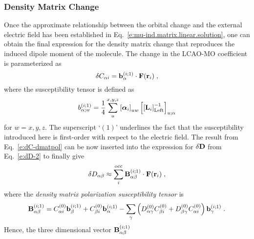 \documentclass[aip,jcp,preprint,amsmath,amssymb,floatfix]{revtex4-1}
\newcommand{\BM}[1]{\bm{#1}}
\begin{document}
\subsubsection{Density Matrix Change}

Once the approximate relationship between the orbital change and the external electric field
has been established in Eq.~\eqref{e:mu-ind.matrix.linear.solution},
one can obtain the final expression for the density matrix change 
that reproduces the induced dipole moment of the molecule.
The change in the LCAO\hyp{}MO coefficient is parameterized as
%
\begin{equation} \label{e:dC-dmatpol}
 \delta C_{\alpha i} = {\bf b}_{\alpha}^{(i;1)} \cdot {\bf F}({\bf r}_i)  \;,
\end{equation}
%
where the susceptibility tensor is defined as
%
\begin{equation} \label{e:susceptibility-b}
  b_{\alpha;w}^{(i;1)}= \frac{1}{4} \sum_u^{x, y, z} \left[ {\BM{\alpha}}_i \right]_{uw}
   \left[ \left[ {\bf L}_i  \right]^{-1}_{\rm Left} \right]_{u;\alpha}  
\end{equation}
%
for $w=x,y,z$. 
The superscript `$(1)$' underlines the fact that the susceptibility introduced here
is first\hyp{}order with respect to the electric field.
The result from Eq.~\eqref{e:dC-dmatpol} can be now inserted into 
the expression for $\delta {\bf D}$ from Eq.~\eqref{e:dD-2} to finally give
%
\begin{equation}\label{e:final-model.HF}
 \delta D_{\alpha\beta} \approx \sum_i^{\rm occ} {\bf B}^{(i;1)}_{\alpha\beta} \cdot {\bf F}({\bf r}_i)  \;,
\end{equation}
%
where the \emph{density matrix polarization susceptibility tensor} is
%
\begin{equation}  \label{e:susceptibility-B}
 {\bf B}^{(i;1)}_{\alpha\beta} = 
                               C_{\alpha i}^{(0)} {\bf b}_{\beta}^{(i;1)} + C_{\beta i}^{(0)} {\bf b}_\alpha^{(i;1)} %
                                - \sum_\gamma 
                                 \left( 
               D_{\alpha\gamma}^{(0)} C_{\beta i}^{(0)} + D_{\beta\gamma}^{(0)} C_{\alpha i}^{(0)}
                                 \right)
                                           {\bf b}_{\gamma}^{(i;1)}
 \;.
\end{equation}
%
Hence, the three dimensional vector ${\bf B}^{(i;1)}_{\alpha\beta}$ 
\end{document}

